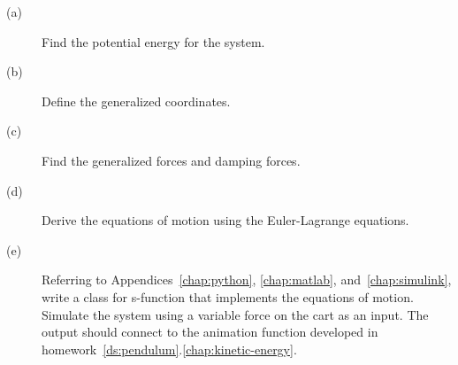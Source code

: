 \begin{description}\item[]
    \item[(a)] Find the potential energy for the system.
    \item[(b)] Define the generalized coordinates.
    \item[(c)] Find the generalized forces and damping forces.
    \item[(d)] Derive the equations of motion using the Euler-Lagrange equations.
    \item[(e)] Referring to Appendices~\ref{chap:python}, \ref{chap:matlab}, and~\ref{chap:simulink}, write a class for s-function that implements the equations of motion.  Simulate the system using a variable force on the cart as an input.  The output should connect to the animation function developed in homework~\ref{ds:pendulum}.\ref{chap:kinetic-energy}.
\end{description}
